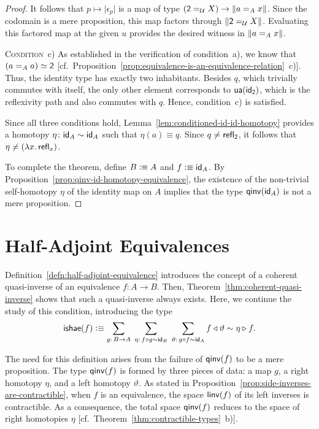 \begin{proof}
    It follows that $p\mapsto\lvert\epsilon_p\rvert$ is a map of type $(\mathsf{2}\mathrel{=_{\mathcal U}} X)\to\lVert a\mathrel{=_{A}}x\rVert$. Since the codomain is a mere proposition, this map factors through $\lVert\mathsf{2}\mathrel{=_{\mathcal U}} X\rVert$. Evaluating this factored map at the given $u$ provides the desired witness in $\lVert a\mathrel{=_{A}}x\rVert$.

    \textsc{Condition}~c) As established in the verification of condition~a), we know that $(a\mathrel{=_{A}}a)\simeq\mathsf{2}$ [cf.~Proposition~\ref{prop:equivalence-is-an-equivalence-relation}~c)]. Thus, the identity type has exactly two inhabitants. Besides $q$, which trivially commutes with itself, the only other element corresponds to $\mathsf{ua}(\mathsf{id}_{\mathsf{2}})$, which is the reflexivity path and also commutes with $q$. Hence, condition~c) is satisfied.
    
    Since all three conditions hold, Lemma~\ref{lem:conditioned-id-id-homotopy} provides a homotopy $\eta\colon\id_A\sim\id_A$ such that $\eta(a)\equiv q$. Since $q\ne\mathsf{refl}_{\mathsf{2}}$, it follows that $\eta\ne(\lambda x.\,\mathsf{refl}_x)$.

    To complete the theorem, define $B\mathrel{\vcentcolon}\equiv A$ and $f\mathrel{\vcentcolon}\equiv\mathsf{id}_A$. By Proposition~\ref{prop:qinv-id-homotopy-equivalence}, the existence of the non-trivial self-homotopy $\eta$ of the identity map on $A$ implies that the type $\mathsf{qinv}(\mathsf{id}_A)$ is not a mere proposition.

\end{proof}

\section{Half-Adjoint Equivalences}

Definition~\ref{defn:half-adjoint-equivalence} introduces the concept of a coherent quasi-inverse of an equivalence $f\colon A\to B$. Then, Theorem~\ref{thm:coherent-quasi-inverse} shows that such a quasi-inverse always exists. Here, we continue the study of this condition, introducing the type
\begin{equation}\label{eq:half-adjoint-homotopy}
    \fun{ishae}(f)\defeq
        \sum_{g\colon B\to A}\;
        \sum_{\eta\colon f\circ g\sim\id_B}\;
        \sum_{\vartheta\colon g\circ f\sim\id_A}
        f\lwct\vartheta\sim\eta\rwct f.
\end{equation}

The need for this definition arises from the failure of $\mathsf{qinv}(f)$ to be a mere proposition. The type $\mathsf{qinv}(f)$ is formed by three pieces of data: a map $g$, a right homotopy $\eta$, and a left homotopy $\vartheta$. As stated in Proposition~\ref{prop:side-inverses-are-contractible}, when $f$ is an equivalence, the space $\mathsf{linv}(f)$ of its left inverses is contractible. As a consequence, the total space $\mathsf{qinv}(f)$ reduces to the space of right homotopies $\eta$ [cf.~Theorem~\ref{thm:contractible-types}~b)].

